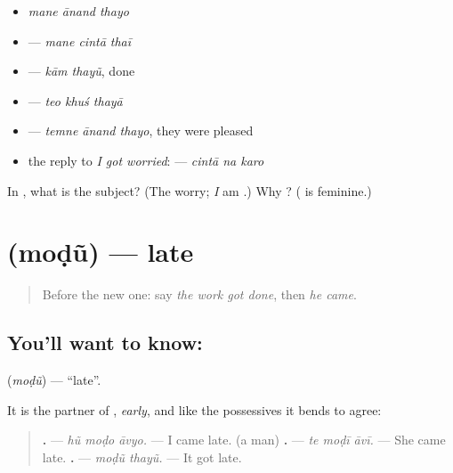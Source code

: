 \begin{itemize}
\raggedright
  \item \emph{mane ānand thayo}
  \item \textbf{  } — \emph{mane cintā thaī}
  \item \textbf{ } — \emph{kām thayũ}, done
  \item \textbf{  } — \emph{teo khuś thayā}
  \item \textbf{  } — \emph{temne ānand thayo}, they were pleased
  \item the reply to \emph{I got worried}: \textbf{  } — \emph{cintā na karo}
\end{itemize}

\begin{tcolorbox}[breakable,colback=teal!4,colframe=teal!35!black,title={Before you move on}]
In \textbf{  }, what is the subject? (The worry; \emph{I} am \textbf{}.) Why \textbf{}? (\textbf{} is feminine.)
\end{tcolorbox}
\section[\texorpdfstring{\gu{મોડું} (moḍũ)}{મોડું (moḍũ)}]{ (moḍũ) — late}

\label{lesson:GU-C147-modu}



\begin{quote}
Before the new one: say \emph{the work got done}, then \emph{he came}.
\end{quote}

\subsection*{You'll want to know: }
\textbf{} (\emph{moḍũ}) — \textquotedblleft{}late\textquotedblright{}.

It is the partner of \textbf{}, \emph{early}, and like the possessives it bends to agree:

\begin{quote}
\textbf{  .} — \emph{hũ moḍo āvyo.} — I came late. (a man) \textbf{  .} — \emph{te moḍī āvī.} — She came late. \textbf{ .} — \emph{moḍũ thayũ.} — It got late.
\end{quote}

